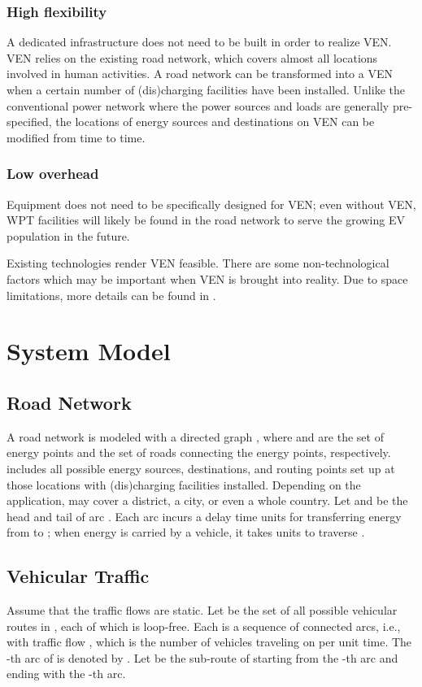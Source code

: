 \documentclass[journal]{IEEEtran}
\begin{document}
\subsubsection{High flexibility}
A dedicated infrastructure does not need to be built in order to realize VEN. VEN relies on the existing road network, which covers  almost all locations involved in human activities. A road network can be transformed into a VEN when a certain number of (dis)charging facilities  have been installed. Unlike the conventional power network where the power sources and loads are generally pre-specified, the locations of  energy sources and destinations on VEN can be modified from time to time.
\subsubsection{Low overhead}
Equipment does not need to be specifically designed for VEN; even without VEN, WPT facilities will likely be found in the road network to serve the growing EV population in the future.


Existing technologies render VEN feasible. There are some non-technological factors which may be important when VEN is brought into reality. Due to space limitations, more details can be found in \cite{VEN_conf}.



\section{System Model} \label{sec:model}
\subsection{Road Network}
A road network is modeled with a directed graph , where  and  are the set of energy points and the set of roads connecting the energy points, respectively.  includes all possible energy sources, destinations, and routing points set up at those locations with (dis)charging facilities installed. Depending on the application,  may cover a district, a city, or even a whole country. Let  and  be the head and tail of arc . Each arc  incurs a delay  time units for transferring energy from  to ; when energy is carried by a vehicle, it takes  units to traverse . 

\subsection{Vehicular Traffic}
Assume that the traffic flows are static. Let  be the set of all possible vehicular routes in , each of which is loop-free. Each  is a sequence of connected arcs, i.e.,  with traffic flow , which is the number of vehicles traveling on  per unit time. The -th arc of  is denoted by . Let  be the sub-route of  starting from the -th arc and ending with the -th arc. 
\end{document}
